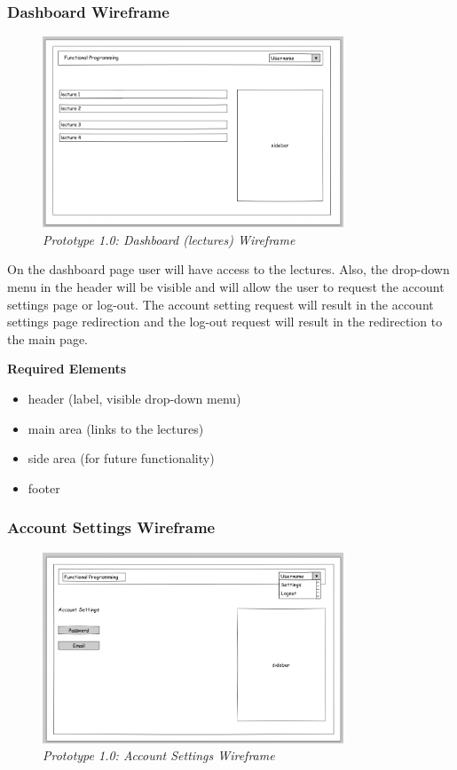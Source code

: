\documentclass[12pt,twoside,a4paper]{report}
\begin{document}
\subsubsection{Dashboard Wireframe}\label{3.7.1.2}
\begin{figure}[!ht]
	\centering
		\includegraphics[width=0.8\textwidth, totalheight=7cm]
		{wireframe_dashboard}
	\caption{\textit{Prototype 1.0: Dashboard (lectures) Wireframe}}
	\label{f3.7.1.2}
\end{figure}

On the dashboard page user will have access to the lectures. Also, the drop-down menu in the header will be visible and will allow the user to request the account settings page or log-out. The account setting request will result in the account settings page redirection and the log-out request will result in the redirection to the main page.

\textbf{Required Elements}
\begin{itemize}\itemsep1pt \parskip0pt 
\item header (label, visible drop-down menu)
\item main area (links to the lectures)
\item side area (for future functionality)
\item footer
\end{itemize}

\subsubsection{Account Settings Wireframe}\label{3.7.1.3}
\begin{figure}[!ht]
	\centering
		\includegraphics[width=0.8\textwidth, totalheight=7cm]
		{wireframe_account_settings}
	\caption{\textit{Prototype 1.0: Account Settings Wireframe}}
	\label{f3.7.1.3}
\end{figure}
\end{document}
